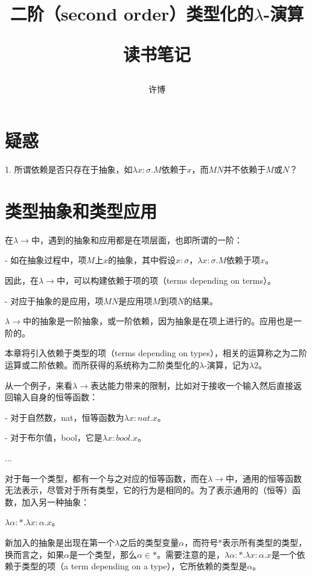 \documentclass[UTF8]{article}
\title{二阶（second order）类型化的$\lambda$-演算\\[2ex]\begin{large}读书笔记\end{large}}
\author{许博}
\date{}
\begin{document}
\maketitle
	\section{疑惑}
	
	1. 所谓依赖是否只存在于抽象，如$\lambda x:\sigma.M$依赖于$x$，而$MN$并不依赖于$M$或$N$？

	\section{类型抽象和类型应用}
		\noindent
		在$\lambda{\rightarrow}$中，遇到的抽象和应用都是在项层面，也即所谓的一阶：
		
		\noindent
		- 如在抽象过程中，项$M$上$x$的抽象，其中假设$x:\sigma$，$\lambda x:\sigma.M$依赖于项$x$。
		
		因此，在$\lambda{\rightarrow}$中，可以构建依赖于项的项（terms depending on terms）。
			
		\noindent
		- 对应于抽象的是应用，项$MN$是应用项$M$到项$N$的结果。
		
		$\lambda{\rightarrow}$中的抽象是一阶抽象，或一阶依赖，因为抽象是在项上进行的。应用也是一阶的。
		
		本章将引入依赖于类型的项（terms depending on types），相关的运算称之为二阶运算或二阶依赖。而所获得的系统称为二阶类型化的$\lambda$-演算，记为$\lambda{2}$。
		
		从一个例子，来看$\lambda{\rightarrow}$表达能力带来的限制，比如对于接收一个输入然后直接返回输入自身的恒等函数：
		
		\noindent
		- 对于自然数，nat，恒等函数为$\lambda x:nat.x$。
		
		\noindent
		- 对于布尔值，bool，它是$\lambda x:bool.x$。
		
		\noindent ...
		
		对于每一个类型，都有一个与之对应的恒等函数，而在$\lambda{\rightarrow}$中，通用的恒等函数无法表示，尽管对于所有类型，它的行为是相同的。为了表示通用的（恒等）函数，加入另一种抽象：
		
		$\lambda\alpha:*.\lambda x:\alpha.x$。
		
		新加入的抽象是出现在第一个$\lambda$之后的类型变量$\alpha$，而符号*表示所有类型的类型，换而言之，如果$\alpha$是一个类型，那么$\alpha\in *$。需要注意的是，$\lambda\alpha:*.\lambda x:\alpha.x$是一个依赖于类型的项（a  term depending on a type），它所依赖的类型是$\alpha$。
		
\end{document}
